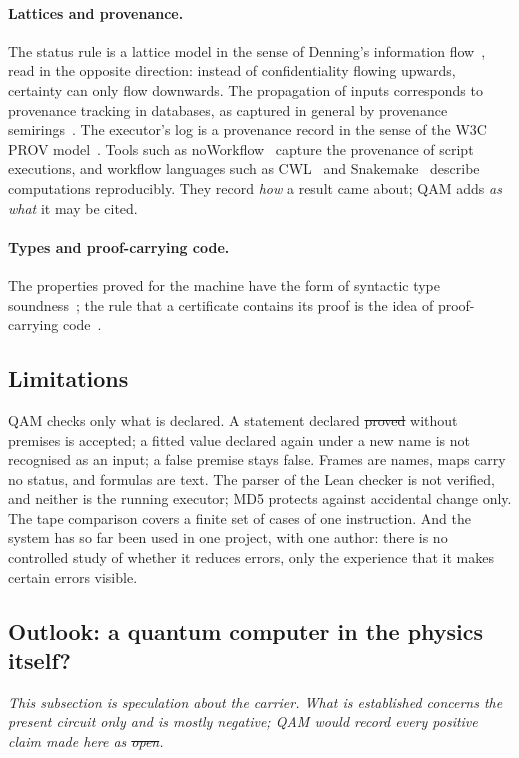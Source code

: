 \paragraph{Lattices and provenance.} The status rule is a lattice model in the sense of Denning's information flow~\cite{denning76},
read in the opposite direction: instead of confidentiality flowing upwards, certainty can only flow downwards. The propagation of inputs
corresponds to provenance tracking in databases, as captured in general by provenance semirings~\cite{semiring}. The executor's log is a
provenance record in the sense of the W3C PROV model~\cite{prov}. Tools such as noWorkflow~\cite{noworkflow} capture the provenance of
script executions, and workflow languages such as CWL~\cite{cwl} and Snakemake~\cite{snakemake} describe computations reproducibly. They
record \emph{how} a result came about; QAM adds \emph{as what} it may be cited.

\paragraph{Types and proof-carrying code.} The properties proved for the machine have the form of syntactic type
soundness~\cite{wright94,pierce}; the rule that a certificate contains its proof is the idea of proof-carrying code~\cite{necula}.

\subsection{Limitations}

QAM checks only what is declared. A statement declared \st{proved} without premises is accepted; a fitted value declared again under a
new name is not recognised as an input; a false premise stays false. Frames are names, maps carry no status, and formulas are text. The
parser of the Lean checker is not verified, and neither is the running executor; MD5 protects against accidental change only. The tape
comparison covers a finite set of cases of one instruction. And the system has so far been used in one project, with one author: there
is no controlled study of whether it reduces errors, only the experience that it makes certain errors visible.

\subsection{Outlook: a quantum computer in the physics itself?}

\emph{This subsection is speculation about the carrier. What is established concerns the present circuit only and is mostly negative;
QAM would record every positive claim made here as \st{open}.}

